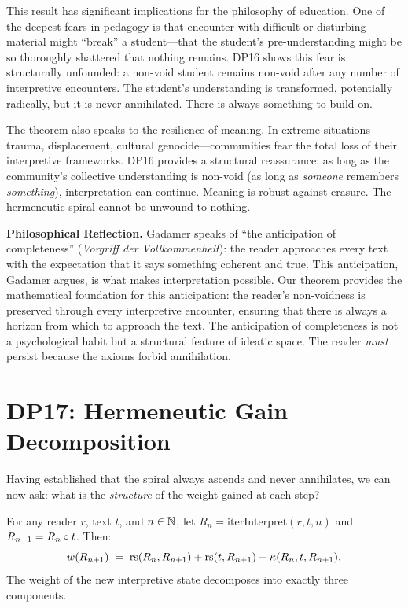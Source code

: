 This result has significant implications for the philosophy of
education. One of the deepest fears in pedagogy is that encounter with
difficult or disturbing material might ``break'' a student---that the
student's pre-understanding might be so thoroughly shattered that
nothing remains. DP16 shows this fear is structurally unfounded: a
non-void student remains non-void after any number of interpretive
encounters. The student's understanding is transformed, potentially
radically, but it is never annihilated. There is always something to
build on.

The theorem also speaks to the resilience of meaning. In extreme
situations---trauma, displacement, cultural genocide---communities fear
the total loss of their interpretive frameworks. DP16 provides a
structural reassurance: as long as the community's collective
understanding is non-void (as long as \emph{someone} remembers
\emph{something}), interpretation can continue. Meaning is robust
against erasure. The hermeneutic spiral cannot be unwound to nothing.

\begin{reflectionbox}
\textbf{Philosophical Reflection.}
Gadamer speaks of ``the anticipation of completeness''
(\textit{Vorgriff der Vollkommenheit}): the reader approaches every text
with the expectation that it says something coherent and true. This
anticipation, Gadamer argues, is what makes interpretation possible. Our
theorem provides the mathematical foundation for this anticipation: the
reader's non-voidness is preserved through every interpretive encounter,
ensuring that there is always a horizon from which to approach the text.
The anticipation of completeness is not a psychological habit but a
structural feature of ideatic space. The reader \emph{must} persist
because the axioms forbid annihilation.
\end{reflectionbox}

\section{DP17: Hermeneutic Gain Decomposition}

Having established that the spiral always ascends and never annihilates,
we can now ask: what is the \emph{structure} of the weight gained at
each step?

\begin{theorem}
\label{thm:hermeneutic-gain}
For any reader $r$, text $t$, and $n \in \mathbb{N}$, let
$R_n = \mathrm{iterInterpret}(r, t, n)$ and $R_{n+1} = R_n \circ t$.
Then:
\[
w(R_{n+1}) \;=\; \mathrm{rs}(R_n, R_{n+1}) + \mathrm{rs}(t, R_{n+1}) +
\kappa(R_n, t, R_{n+1}).
\]
The weight of the new interpretive state decomposes into exactly three
components.
\end{theorem}

